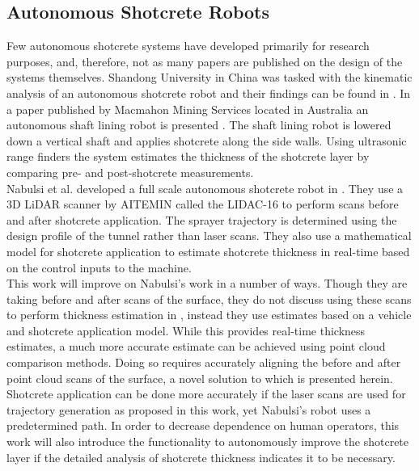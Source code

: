 \subsection{Autonomous Shotcrete Robots}

Few autonomous shotcrete systems have developed primarily for research purposes, and, therefore, not as many papers are published on the design of the systems themselves. Shandong University in China was tasked with the kinematic analysis of an autonomous shotcrete robot and their findings can be found in \cite{kinshot}. In a paper published by Macmahon Mining Services located in Australia an autonomous shaft lining robot is presented \cite{sliner}. The shaft lining robot is lowered down a vertical shaft and applies shotcrete along the side walls. Using ultrasonic range finders the system estimates the thickness of the shotcrete layer by comparing pre- and post-shotcrete measurements.\\

Nabulsi et al. developed a full scale autonomous shotcrete robot in \cite{nabulsi}. They use a 3D LiDAR scanner by AITEMIN called the LIDAC-16 to perform scans before and after shotcrete application. The sprayer trajectory is determined using the design profile of the tunnel rather than laser scans. They also use a mathematical model for shotcrete application to estimate shotcrete thickness in real-time based on the control inputs to the machine.\\

This work will improve on Nabulsi's work in a number of ways. Though they are taking before and after scans of the surface, they do not discuss using these scans to perform thickness estimation in \cite{nabulsi}, instead they use estimates based on a vehicle and shotcrete application model. While this provides real-time thickness estimates, a much more accurate estimate can be achieved using point cloud comparison methods. Doing so requires accurately aligning the before and after point cloud scans of the surface, a novel solution to which is presented herein. Shotcrete application can be done more accurately if the laser scans are used for trajectory generation as proposed in this work, yet Nabulsi's robot uses a predetermined path. In order to decrease dependence on human operators, this work will also introduce the functionality to autonomously improve the shotcrete layer if the detailed analysis of shotcrete thickness indicates it to be necessary.\\


